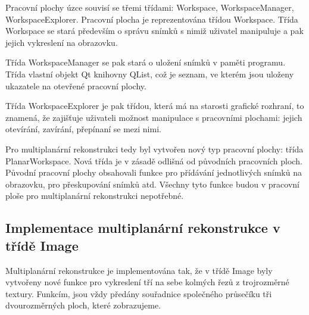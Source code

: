 Pracovní plochy úzce souvisí se třemi třídami: Workspace, WorkspaceManager, WorkspaceExplorer. Pracovní plocha je reprezentována třídou Workspace. Třída Workspace se stará především o správu snímků s nimiž uživatel manipuluje a pak jejich vykreslení na obrazovku.

Třída WorkspaceManager se pak stará o uložení snímků v paměti programu. Třída vlastní objekt Qt knihovny QList, což je seznam, ve kterém jsou uloženy ukazatele na otevřené pracovní plochy.

Třída WorkspaceExplorer je pak třídou, která má na starosti grafické rozhraní, to znamená, že zajišťuje uživateli možnost manipulace s pracovními plochami: jejich otevírání, zavírání, přepínaní se mezi nimi.

Pro multiplanární rekonstrukci tedy byl vytvořen nový typ pracovní plochy: třída PlanarWorkspace. Nová třída je v zásadě odlišná od původních pracovních ploch. Původní pracovní plochy obsahovali funkce pro přídávání jednotlivých snímků na obrazovku, pro přeskupování snímků atd. Všechny tyto funkce budou v pracovní ploše pro multiplanární rekonstrukci nepotřebné.

\subsection{Implementace multiplanární rekonstrukce v třídě Image}
Multiplanární rekonstrukce je implementována tak, že v třídě Image byly vytvořeny nové funkce pro vykreslení tří na sebe kolmých řezů z trojrozměrné textury. Funkcím, jsou vždy předány souřadnice společného průsečíku tři dvourozměrných ploch, které zobrazujeme.

